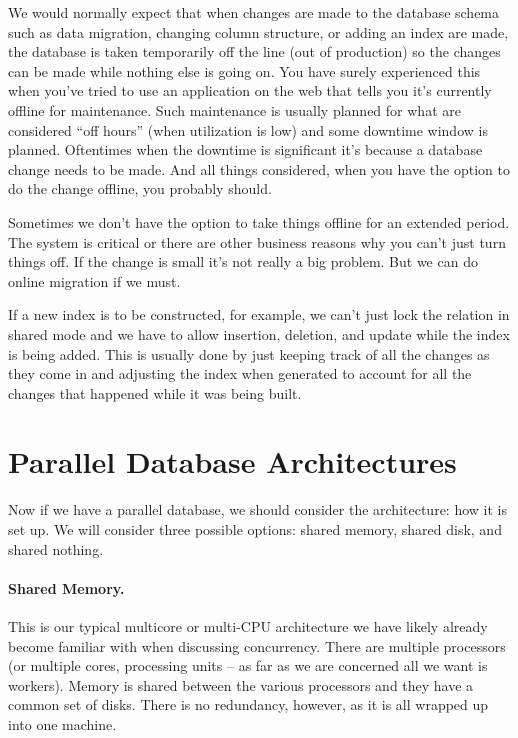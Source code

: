 We would normally expect that when changes are made to the database schema such as data migration, changing column structure, or adding an index are made, the database is taken temporarily off the line (out of production) so the changes can be made while nothing else is going on. You have surely experienced this when you've tried to use an application on the web that tells you it's currently offline for maintenance. Such maintenance is usually planned for what are considered ``off hours'' (when utilization is low) and some downtime window is planned. Oftentimes when the downtime is significant it's because a database change needs to be made. And all things considered, when you have the option to do the change offline, you probably should.

Sometimes we don't have the option to take things offline for an extended period. The system is critical or there are other business reasons why you can't just turn things off. If the change is small it's not really a big problem. But we can do online migration if we must. 

If a new index is to be constructed, for example, we can't just lock the relation in shared mode and we have to allow insertion, deletion, and update while the index is being added. This is usually done by just keeping track of all the changes as they come in and adjusting the index when generated to account for all the changes that happened while it was being built.

\section*{Parallel Database Architectures}

Now if we have a parallel database, we should consider the architecture: how it is set up. We will consider three possible options: shared memory, shared disk, and shared nothing.

\paragraph{Shared Memory.} This is our typical multicore or multi-CPU architecture we have likely already become familiar with when discussing concurrency. There are multiple processors (or multiple cores, processing units -- as far as we are concerned all we want is workers). Memory is shared between the various processors and they have a common set of disks. There is no redundancy, however, as it is all wrapped up into one machine.

